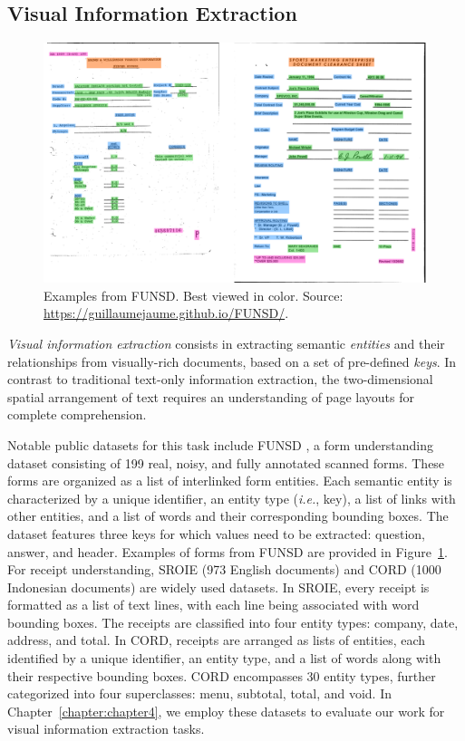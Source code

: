 \subsection{Visual Information Extraction}

\begin{figure}
    \centering
    \includegraphics[width=\textwidth]{images/chapter2/two_forms.pdf}
    \caption{Examples from FUNSD. Best viewed in color. Source: \url{https://guillaumejaume.github.io/FUNSD/}.}
    \label{fig:examples-funsd}
  \end{figure}
  

\textit{Visual information extraction} consists in extracting semantic \textit{entities} and their relationships from visually-rich documents, based on a set of pre-defined \textit{keys}. In contrast to traditional text-only information extraction, the two-dimensional spatial arrangement of text requires an understanding of page layouts for complete comprehension. 

Notable public datasets for this task include \ac{FUNSD} \citep{jaume2019funsd}, a form understanding dataset consisting of 199 real, noisy, and fully annotated scanned forms. These forms are organized as a list of interlinked form entities. Each semantic entity is characterized by a unique identifier, an entity type (\textit{i.e.}, key), a list of links with other entities, and a list of words and their corresponding bounding boxes. The dataset features three keys for which values need to be extracted: question, answer, and header. Examples of forms from \ac{FUNSD} are provided in Figure~\ref{fig:examples-funsd}. For receipt understanding, \ac{SROIE} \citep{huang2019icdar2019} (973 English documents) and \ac{CORD} \citep{park2019cord} (1000 Indonesian documents) are widely used datasets. In \ac{SROIE}, every receipt is formatted as a list of text lines, with each line being associated with word bounding boxes. The receipts are classified into four entity types: company, date, address, and total. In \ac{CORD}, receipts are arranged as lists of entities, each identified by a unique identifier, an entity type, and a list of words along with their respective bounding boxes. \ac{CORD} encompasses 30 entity types, further categorized into four superclasses: menu, subtotal, total, and void. In Chapter~\ref{chapter:chapter4}, we employ these datasets to evaluate our work for visual information extraction tasks.

